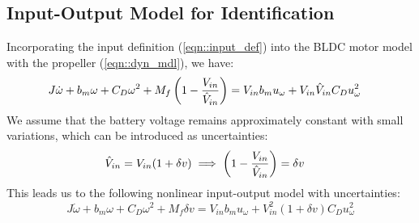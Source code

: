 \subsection{Input-Output Model for Identification}
Incorporating the input definition (\ref{eqn::input_def}) into the BLDC motor model with the propeller (\ref{eqn::dyn_mdl}), we have:
{\small
\begin{align}
    &J \dot \omega + b_m \omega + C_D \omega^2 + M_f \left( 1 - \frac{V_{in}}{\hat V_{in}} \right) = V_{in} b_m u_\omega + V_{in} \hat V_{in} C_D u_\omega^2
    \label{eqn::calib_mdl}
\end{align}
}
We assume that the battery voltage remains approximately constant with small variations, which can be introduced as uncertainties:
\begin{align}
    \hat V_{in} &= V_{in} ( 1 + \delta v)
    \implies \left( 1 - \frac{V_{in}}{\hat V_{in}} \right) = \delta v
\end{align}
This leads us to the following nonlinear input-output model with uncertainties:
\begin{equation}\label{eqn::nl_model}
    J \dot \omega + b_m \omega + C_D \omega^2 + M_f \delta v = V_{in} b_m u_\omega + V_{in}^2 (1 + \delta v) C_D u_\omega^2
\end{equation}
